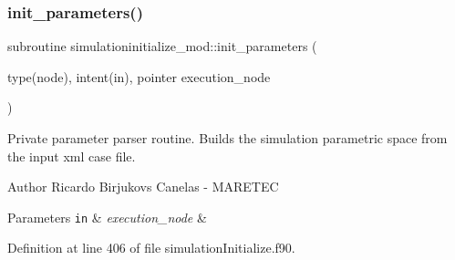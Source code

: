 \subsubsection{\texorpdfstring{init\+\_\+parameters()}{init\_parameters()}}
{\footnotesize\ttfamily subroutine simulationinitialize\+\_\+mod\+::init\+\_\+parameters (\begin{DoxyParamCaption}\item[{type(node), intent(in), pointer}]{execution\+\_\+node }\end{DoxyParamCaption})\hspace{0.3cm}{\ttfamily [private]}}



Private parameter parser routine. Builds the simulation parametric space from the input xml case file. 

\begin{DoxyAuthor}{Author}
Ricardo Birjukovs Canelas -\/ M\+A\+R\+E\+T\+EC 
\end{DoxyAuthor}

\begin{DoxyParams}[1]{Parameters}
\mbox{\tt in}  & {\em execution\+\_\+node} & \\
\hline
\end{DoxyParams}


Definition at line 406 of file simulation\+Initialize.\+f90.


